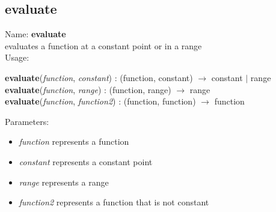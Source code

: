 \subsection{evaluate}
\label{labevaluate}
\noindent Name: \textbf{evaluate}\\
evaluates a function at a constant point or in a range\\
\noindent Usage: 
\begin{center}
\textbf{evaluate}(\emph{function}, \emph{constant}) : (\textsf{function}, \textsf{constant}) $\rightarrow$ \textsf{constant} $|$ \textsf{range}\\
\textbf{evaluate}(\emph{function}, \emph{range}) : (\textsf{function}, \textsf{range}) $\rightarrow$ \textsf{range}\\
\textbf{evaluate}(\emph{function}, \emph{function2}) : (\textsf{function}, \textsf{function}) $\rightarrow$ \textsf{function}\\
\end{center}
Parameters: 
\begin{itemize}
\item \emph{function} represents a function
\item \emph{constant} represents a constant point
\item \emph{range} represents a range
\item \emph{function2} represents a function that is not constant
\end{itemize}
